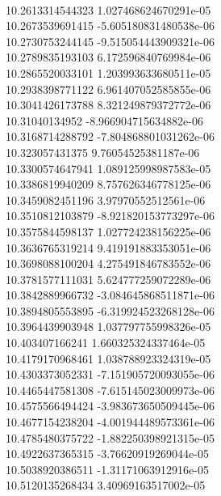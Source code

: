 { \\
10.2613314544323 1.027468624670291e-05
 \\
10.2673539691415 -5.605180831480538e-06
 \\
10.2730753244145 -9.515054443909321e-06
 \\
10.2789835193103 6.172596840769984e-06
 \\
10.2865520033101 1.203993633680511e-05
 \\
10.2938398771122 6.961407052585855e-06
 \\
10.3041426173788 8.321249879372772e-06
 \\
10.31040134952 -8.966904715634882e-06
 \\
10.3168714288792 -7.804868801031262e-06
 \\
10.323057431375 9.76054525381187e-06
 \\
10.3300574647941 1.089125998987583e-05
 \\
10.3386819940209 8.757626346778125e-06
 \\
10.3459082451196 3.97970552512561e-06
 \\
10.3510812103879 -8.921820153773297e-06
 \\
10.3575844598137 1.027724238156225e-06
 \\
10.3636765319214 9.419191883353051e-06
 \\
10.3698088100204 4.275491846783552e-06
 \\
10.3781577111031 5.624777259072289e-06
 \\
10.3842889966732 -3.084645868511871e-06
 \\
10.3894805553895 -6.319924523268128e-06
 \\
10.3964439903948 1.037797755998326e-05
 \\
10.403407166241 1.660325324337464e-05
 \\
10.4179170968461 1.038788923324319e-05
 \\
10.4303373052331 -7.151905720093055e-06
 \\
10.4465447581308 -7.615145023009973e-06
 \\
10.4575566494424 -3.983673650509445e-06
 \\
10.4677154238204 -4.001944489573361e-06
 \\
10.4785480375722 -1.882250398921315e-05
 \\
10.4922637365315 -3.76620919269044e-05
 \\
10.5038920386511 -1.31171063912916e-05
 \\
10.5120135268434 3.40969163517002e-05
 \\
}
